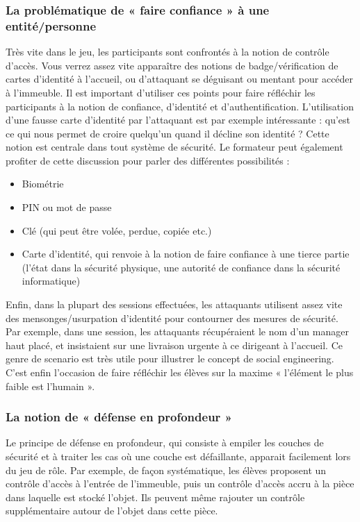 \documentclass[11pt]{article} %
\begin{document}
\subsubsection{La problématique de « faire confiance » à une entité/personne }
Très vite dans le jeu, les participants sont confrontés à la notion de contrôle
d'accès. Vous verrez assez vite apparaître des notions de badge/vérification de
cartes d'identité à l'accueil, ou d'attaquant se déguisant ou mentant pour
accéder à l'immeuble. Il est important d'utiliser ces points pour faire
réfléchir les participants à la notion de confiance, d'identité et
d'authentification. L'utilisation d'une fausse carte d'identité par l'attaquant
est par exemple intéressante : qu'est ce qui nous permet de croire quelqu'un
quand il décline son identité ? Cette notion est centrale dans tout système de
sécurité. Le formateur peut également profiter de cette discussion pour parler
des différentes possibilités :
\begin{itemize}
\item	Biométrie
\item	PIN ou mot de passe
\item	Clé (qui peut être volée, perdue, copiée etc.)
\item Carte d'identité, qui renvoie à la notion de faire confiance à une tierce
partie (l'état dans la sécurité physique, une autorité de confiance dans la
sécurité informatique)
\end{itemize}

Enfin, dans la plupart des sessions effectuées, les attaquants utilisent assez
vite des mensonges/usurpation d'identité pour contourner des mesures de
sécurité. Par exemple, dans une session, les attaquants récupéraient le nom d'un
manager haut placé, et insistaient sur une livraison urgente à ce dirigeant à
l'accueil. Ce genre de scenario est très utile pour illustrer le concept de
social engineering. C'est enfin l'occasion de faire réfléchir les élèves sur la
maxime « l'élément le plus faible est l'humain ».

\subsubsection{La notion de « défense en profondeur »}
Le principe de défense en profondeur, qui consiste à empiler les couches de
sécurité et à traiter les cas où une couche est défaillante, apparait facilement
lors du jeu de rôle. Par exemple, de façon systématique, les élèves proposent un
contrôle d'accès à l'entrée de l'immeuble, puis un contrôle d'accès accru à la
pièce dans laquelle est stocké l'objet. Ils peuvent même rajouter un contrôle
supplémentaire autour de l'objet dans cette pièce.
\end{document}

